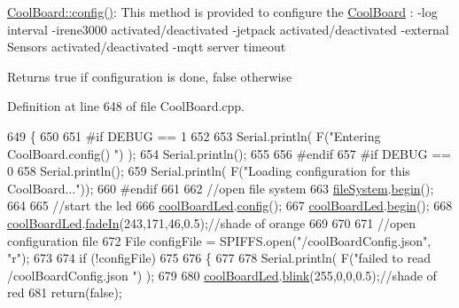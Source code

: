 \hyperlink{class_cool_board_a583a874c09c07e70a6eb9229fc4beddb}{Cool\+Board\+::config()}\+: This method is provided to configure the \hyperlink{class_cool_board}{Cool\+Board} \+: -\/log interval -\/irene3000 activated/deactivated -\/jetpack activated/deactivated -\/external Sensors activated/deactivated -\/mqtt server timeout

\begin{DoxyReturn}{Returns}
true if configuration is done, false otherwise 
\end{DoxyReturn}


Definition at line 648 of file Cool\+Board.\+cpp.


\begin{DoxyCode}
649 \{
650 
651 \textcolor{preprocessor}{#if DEBUG == 1}
652 
653     Serial.println( F(\textcolor{stringliteral}{"Entering CoolBoard.config() "}) );
654     Serial.println();
655 
656 \textcolor{preprocessor}{#endif}
657 \textcolor{preprocessor}{#if DEBUG == 0}
658     Serial.println();
659     Serial.println( F(\textcolor{stringliteral}{"Loading configuration for this CoolBoard..."}));
660 \textcolor{preprocessor}{#endif }
661 
662     \textcolor{comment}{//open file system}
663     \hyperlink{class_cool_board_a42c2586fbb13ff7f06538e9284e8538d}{fileSystem}.\hyperlink{class_cool_file_system_a6ba6f666ed4c530174f8569d2c636748}{begin}();
664     
665     \textcolor{comment}{//start the led}
666     \hyperlink{class_cool_board_a1b1d3c684a5baa56b08486e192fd8e97}{coolBoardLed}.\hyperlink{class_cool_board_led_a1b60e5e30bea96c49ed62ed1bf1ffc8b}{config}();
667     \hyperlink{class_cool_board_a1b1d3c684a5baa56b08486e192fd8e97}{coolBoardLed}.\hyperlink{class_cool_board_led_ae3cbde8affcc6f011cbd698c8ef911f6}{begin}();
668     \hyperlink{class_cool_board_a1b1d3c684a5baa56b08486e192fd8e97}{coolBoardLed}.\hyperlink{class_cool_board_led_ab778f5e7bed0ab74e3906d82110493c3}{fadeIn}(243,171,46,0.5);\textcolor{comment}{//shade of orange     }
669 
670     
671     \textcolor{comment}{//open configuration file}
672     File configFile = SPIFFS.open(\textcolor{stringliteral}{"/coolBoardConfig.json"}, \textcolor{stringliteral}{"r"});
673     
674     \textcolor{keywordflow}{if} (!configFile)
675 
676     \{
677     
678         Serial.println( F(\textcolor{stringliteral}{"failed to read /coolBoardConfig.json  "}) );
679 
680         \hyperlink{class_cool_board_a1b1d3c684a5baa56b08486e192fd8e97}{coolBoardLed}.\hyperlink{class_cool_board_led_a96e1ea13003eee34c9dbcef340404426}{blink}(255,0,0,0.5);\textcolor{comment}{//shade of red     }
681         \textcolor{keywordflow}{return}(\textcolor{keyword}{false});

\end{DoxyCode}
